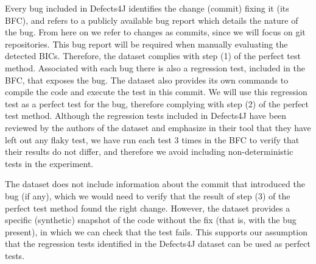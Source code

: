 
Every bug included in Defects4J identifies the change (commit) fixing it (its BFC), and refers to a publicly available bug report which details the nature of the bug.
From here on we refer to changes as commits, since we will focus on git repositories.
This bug report will be required when manually evaluating the detected BICs.
Therefore, the dataset complies with step (1) of the perfect test method. 
Associated with each bug there is also a regression test, included in the BFC, that exposes the bug. 
The dataset also provides its own commands to compile the code and execute the test in this commit. 
We will use this regression test as a perfect test for the bug, therefore complying with step (2) of the perfect test method.
Although the regression tests included in Defects4J have been reviewed by the authors of the dataset and emphasize in their tool that they have left out any flaky test, we have run each test 3 times in the BFC to verify that their results do not differ, and therefore we avoid including non-deterministic tests in the experiment.

The dataset does not include information about the commit that introduced the bug (if any), which we would need to verify that the result of step (3) of the perfect test method found the right change. 
However, the dataset provides a specific (synthetic) snapshot of the code without the fix (that is, with the bug present), in which we can check that the test fails. 
This supports our assumption that the regression tests identified in the Defects4J dataset can be used as perfect tests.

